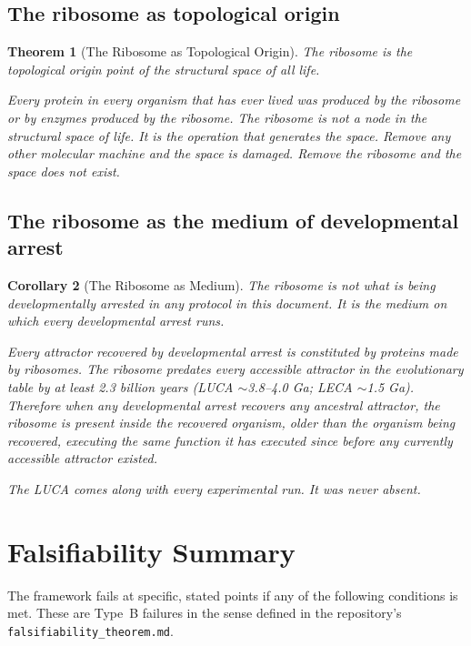 \documentclass[12pt, a4paper]{article}
\newtheorem{theorem}{Theorem}[section]
\newtheorem{corollary}[theorem]{Corollary}
\theoremstyle{definition}
\theoremstyle{remark}
\begin{document}
\subsection{The ribosome as topological origin}

\begin{theorem}[The Ribosome as Topological Origin]
The ribosome is the topological origin point of the
structural space of all life.

Every protein in every organism that has ever lived was
produced by the ribosome or by enzymes produced by the
ribosome. The ribosome is not a node in the structural space
of life. It is the operation that generates the space.
Remove any other molecular machine and the space is damaged.
Remove the ribosome and the space does not exist.
\end{theorem}

\subsection{The ribosome as the medium of developmental arrest}

\begin{corollary}[The Ribosome as Medium]
The ribosome is not what is being developmentally arrested
in any protocol in this document. It is the medium on which
every developmental arrest runs.

Every attractor recovered by developmental arrest is
constituted by proteins made by ribosomes. The ribosome
predates every accessible attractor in the evolutionary
table by at least 2.3 billion years (LUCA $\sim$3.8--4.0
Ga; LECA $\sim$1.5 Ga). Therefore when any developmental
arrest recovers any ancestral attractor, the ribosome is
present inside the recovered organism, older than the
organism being recovered, executing the same function it
has executed since before any currently accessible attractor
existed.

The LUCA comes along with every experimental run. It was
never absent.
\end{corollary}

\section{Falsifiability Summary}

The framework fails at specific, stated points if any of the
following conditions is met. These are Type~B failures in
the sense defined in the repository's
\texttt{falsifiability\_theorem.md}.
\end{document}
